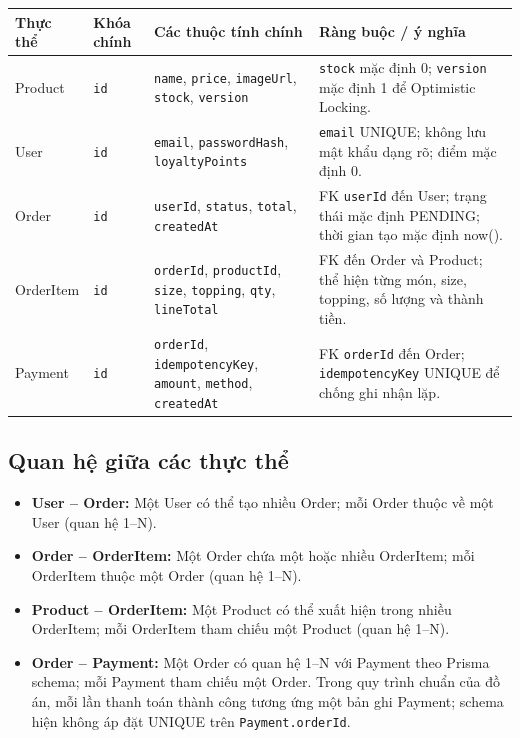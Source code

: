 \begin{center}
\renewcommand{\arraystretch}{1.18}
\begin{tabular}{|p{2.0cm}|p{2.2cm}|p{6.0cm}|p{3.4cm}|}
\hline
\textbf{Thực thể} & \textbf{Khóa chính} & \textbf{Các thuộc tính chính} & \textbf{Ràng buộc / ý nghĩa} \\
\hline
Product & \texttt{id} & \texttt{name}, \texttt{price}, \texttt{imageUrl}, \texttt{stock}, \texttt{version} & \texttt{stock} mặc định 0; \texttt{version} mặc định 1 để Optimistic Locking. \\
\hline
User & \texttt{id} & \texttt{email}, \texttt{passwordHash}, \texttt{loyaltyPoints} & \texttt{email} UNIQUE; không lưu mật khẩu dạng rõ; điểm mặc định 0. \\
\hline
Order & \texttt{id} & \texttt{userId}, \texttt{status}, \texttt{total}, \texttt{createdAt} & FK \texttt{userId} đến User; trạng thái mặc định PENDING; thời gian tạo mặc định now(). \\
\hline
OrderItem & \texttt{id} & \texttt{orderId}, \texttt{productId}, \texttt{size}, \texttt{topping}, \texttt{qty}, \texttt{lineTotal} & FK đến Order và Product; thể hiện từng món, size, topping, số lượng và thành tiền. \\
\hline
Payment & \texttt{id} & \texttt{orderId}, \texttt{idempotencyKey}, \texttt{amount}, \texttt{method}, \texttt{createdAt} & FK \texttt{orderId} đến Order; \texttt{idempotencyKey} UNIQUE để chống ghi nhận lặp. \\
\hline
\end{tabular}
\end{center}

\subsection{Quan hệ giữa các thực thể}

\begin{itemize}
    \item \textbf{User -- Order:} Một User có thể tạo nhiều Order; mỗi Order thuộc về một User (quan hệ 1--N).
    \item \textbf{Order -- OrderItem:} Một Order chứa một hoặc nhiều OrderItem; mỗi OrderItem thuộc một Order (quan hệ 1--N).
    \item \textbf{Product -- OrderItem:} Một Product có thể xuất hiện trong nhiều OrderItem; mỗi OrderItem tham chiếu một Product (quan hệ 1--N).
    \item \textbf{Order -- Payment:} Một Order có quan hệ 1--N với Payment theo Prisma schema; mỗi Payment tham chiếu một Order. Trong quy trình chuẩn của đồ án, mỗi lần thanh toán thành công tương ứng một bản ghi Payment; schema hiện không áp đặt UNIQUE trên \texttt{Payment.orderId}.
\end{itemize}

